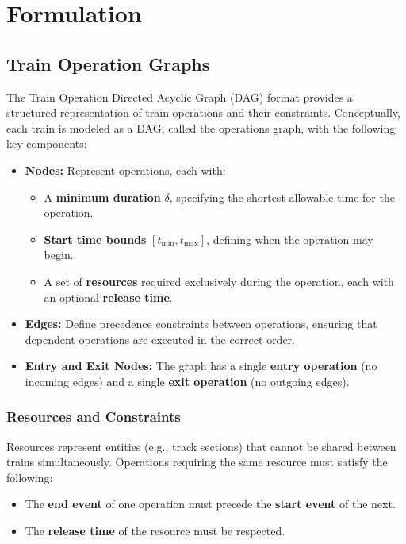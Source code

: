 \documentclass[runningheads]{llncs}
\begin{document}
\section{Formulation}
\label{sse:formulation}

\subsection{Train Operation Graphs}
\label{sss:train_ops}

The Train Operation Directed Acyclic Graph (DAG) format provides a structured representation of train operations and their constraints. Conceptually, each train is modeled as a DAG, called the operations graph, with the following key components:

\begin{itemize}
    \item \textbf{Nodes:} Represent operations, each with:
    \begin{itemize}
        \item A \textbf{minimum duration} $\delta$, specifying the shortest allowable time for the operation.
        \item \textbf{Start time bounds} $[t_{\text{min}}, t_{\text{max}}]$, defining when the operation may begin.
        \item A set of \textbf{resources} required exclusively during the operation, each with an optional \textbf{release time}.
    \end{itemize}
    \item \textbf{Edges:} Define precedence constraints between operations, ensuring that dependent operations are executed in the correct order.
    \item \textbf{Entry and Exit Nodes:} The graph has a single \textbf{entry operation} (no incoming edges) and a single \textbf{exit operation} (no outgoing edges).
\end{itemize}

\subsubsection{Resources and Constraints}
Resources represent entities (e.g., track sections) that cannot be shared between trains simultaneously. Operations requiring the same resource must satisfy the following:
\begin{itemize}
    \item The \textbf{end event} of one operation must precede the \textbf{start event} of the next.
    \item The \textbf{release time} of the resource must be respected.
\end{itemize}
\end{document}
